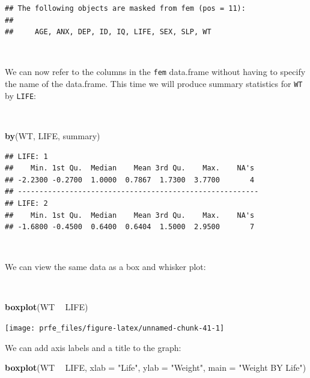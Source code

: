 \documentclass[12pt,a4paper]{book}
\newenvironment{Shaded}{\begin{snugshade}}{\end{snugshade}}
\newcommand{\DataTypeTok}[1]{\textcolor[rgb]{0.13,0.29,0.53}{#1}}
\newcommand{\KeywordTok}[1]{\textcolor[rgb]{0.13,0.29,0.53}{\textbf{#1}}}
\newcommand{\NormalTok}[1]{#1}
\newcommand{\OperatorTok}[1]{\textcolor[rgb]{0.81,0.36,0.00}{\textbf{#1}}}
\newcommand{\StringTok}[1]{\textcolor[rgb]{0.31,0.60,0.02}{#1}}
\theoremstyle{definition}
\theoremstyle{definition}
\theoremstyle{definition}
\theoremstyle{remark}
\begin{document}
\begin{verbatim}
## The following objects are masked from fem (pos = 11):
## 
##     AGE, ANX, DEP, ID, IQ, LIFE, SEX, SLP, WT
\end{verbatim}

~

We can now refer to the columns in the \texttt{fem} data.frame without
having to specify the name of the data.frame. This time we will produce
summary statistics for \texttt{WT} by \texttt{LIFE}:

~

\begin{Shaded}
\begin{Highlighting}[]
\KeywordTok{by}\NormalTok{(WT, LIFE, summary)}
\end{Highlighting}
\end{Shaded}

\begin{verbatim}
## LIFE: 1
##    Min. 1st Qu.  Median    Mean 3rd Qu.    Max.    NA's 
## -2.2300 -0.2700  1.0000  0.7867  1.7300  3.7700       4 
## -------------------------------------------------------- 
## LIFE: 2
##    Min. 1st Qu.  Median    Mean 3rd Qu.    Max.    NA's 
## -1.6800 -0.4500  0.6400  0.6404  1.5000  2.9500       7
\end{verbatim}

~

We can view the same data as a box and whisker plot:

~

\begin{Shaded}
\begin{Highlighting}[]
\KeywordTok{boxplot}\NormalTok{(WT }\OperatorTok{~}\StringTok{ }\NormalTok{LIFE)}
\end{Highlighting}
\end{Shaded}

\begin{center}\texttt{[image: prfe\_files/figure-latex/unnamed-chunk-41-1]} \end{center}

\newpage

We can add axis labels and a title to the graph:

\begin{Shaded}
\begin{Highlighting}[]
\KeywordTok{boxplot}\NormalTok{(WT }\OperatorTok{~}\StringTok{ }\NormalTok{LIFE,}
        \DataTypeTok{xlab =} \StringTok{"Life"}\NormalTok{,}
        \DataTypeTok{ylab =} \StringTok{"Weight"}\NormalTok{,}
        \DataTypeTok{main =} \StringTok{"Weight BY Life"}\NormalTok{)}
\end{Highlighting}
\end{Shaded}
\end{document}
